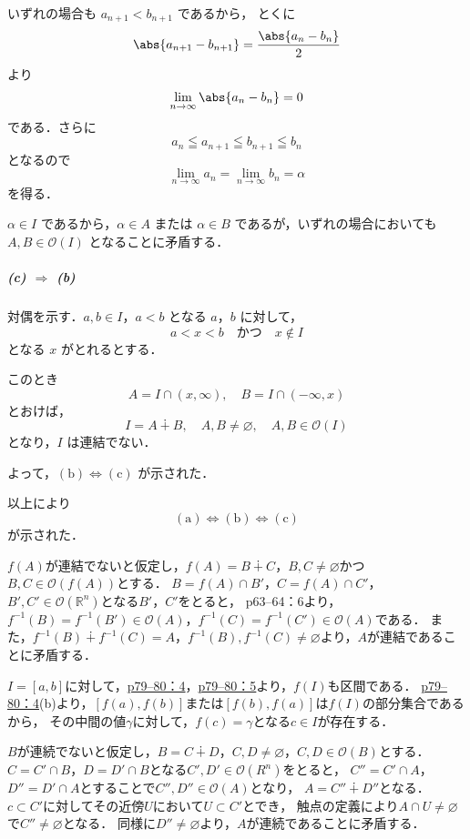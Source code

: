 \begin{tproof}
    いずれの場合も $a_{n+1}< b_{n+1}$ であるから，
    とくに
    \[
        \abs{a_{n+1} - b_{n+1}} = \frac{\abs{a_n - b_n}}{2}
    \]
    より
    \[
        \lim_{n \to \infty} \abs{a_n - b_n} = 0
    \]
    である．さらに
    \[
        a_n \leqq a_{n+1} \leqq b_{n+1} \leqq b_n
    \]
    となるので
    \[
        \lim_{n \to \infty} a_n = \lim_{n \to \infty} b_n = \alpha
    \]
    を得る．

    $\alpha \in I$ であるから，$\alpha \in A$ または $\alpha \in B$ であるが，いずれの場合においても
    $A , B \in \mathcal{O} (I)$ となることに矛盾する．

    \subparagraph{(c) $\Longrightarrow$ (b)}
    対偶を示す．$a,b \in I$，$a < b$ となる $a$，$b$ に対して，
    \[
        a < x < b \quad \text{かつ}\quad x \notin I
    \]
    となる $x$ がとれるとする．

    このとき
    \[
        A = I \cap (x,\infty), \quad B = I \cap (-\infty,x)
    \]
    とおけば，
    \[
        I = A \dotplus B,\quad A , B \ne \varnothing,\quad A , B \in \mathcal{O} (I)
    \]
    となり，$I$ は連結でない．

    よって，$(\text{b}) \iff (\text{c})$ が示された．
    \bigskip

    以上により
    \[
        (\text{a}) \iff (\text{b}) \iff (\text{c})
    \]
    が示された．
\end{tproof}


\begin{tproof}
    $f(A)$が連結でないと仮定し，$f(A) = B \dotplus C$，$B,C \ne \varnothing$かつ$B,C \in \mathcal{O} (f(A))$とする．
    $B = f(A) \cap B '$，$C = f(A) \cap C '$，$B ', C ' \in \mathcal{O} (\mathbb{R}^n)$となる$B'$，$C'$をとると，
    p63--64：6より，$f^{-1} (B) = f^{-1}(B') \in \mathcal{O}(A)$，$f^{-1} (C) = f^{-1}(C') \in \mathcal{O}(A)$である．
    また，$f^{-1}(B) \dotplus f^{-1}(C) =A$，$ f^{-1}(B), f^{-1}(C) \ne \varnothing$より，$A$が連結であることに矛盾する．
\end{tproof}


\begin{tproof}
    $I = [a,b]$に対して，\hyperref[p79--80：4]{p79--80：4}，\hyperref[p79--80：5]{p79--80：5}より，$f(I)$も区間である．
    \hyperref[p79--80：4]{p79--80：4}(b)より，$[f(a),f(b)]$または$[f(b),f(a)]$は$f(I)$の部分集合であるから，
    その中間の値$\gamma$に対して，$f(c)=\gamma$となる$c \in I$が存在する．
\end{tproof}


\begin{tproof}
    $B$が連続でないと仮定し，$B=C\dotplus D$，$C, D \neq \varnothing$，$C,D\in \mathcal{O}(B)$とする．
    $C=C'\cap B$，$D=D'\cap B$となる$C',D'\in \mathcal{O}(R^n)$をとると，
    $C''=C'\cap A$，$D''=D'\cap A$とすることで$C'',D''\in \mathcal{O}(A)$となり，
    $A=C''\dotplus D''$となる．
    $c \subset C'$に対してその近傍$U$において$U\subset C'$とでき，
    触点の定義により$A\cap U\neq \varnothing$で$C''\neq \varnothing$となる．
    同様に$D''\neq \varnothing$より，$A$が連続であることに矛盾する．
\end{tproof}

